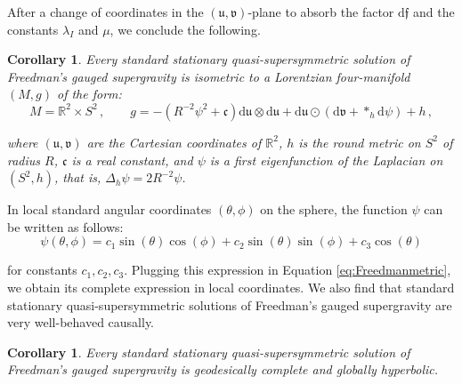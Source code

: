 \documentclass[10pt,a4paper,twoside,reqno]{amsart}
\theoremstyle{plain}
\newtheorem{cor}[thm]{Corollary}
\theoremstyle{definition}
\theoremstyle{remark}
\def\dd{\mathrm{d}}
\def\frf{\mathfrak{f}}
\def\dd{\mathrm{d}}
\def\fru{\mathfrak{u}}
\def\frv{\mathfrak{v}}
\def\frc{\mathfrak{F}}
\def\frc{\mathfrak{c}}
\begin{document}
After a change of coordinates in the $(\fru,\frv)$-plane to absorb the factor $\dd\frf$ and the constants $\lambda_I$ and $\mu$, we conclude the following.

\begin{cor}
Every standard stationary quasi-supersymmetric solution of Freedman's gauged supergravity is isometric to a Lorentzian four-manifold $(M,g)$ of the form:
\begin{equation}
\label{eq:Freedmanmetric}
M = \mathbb{R}^2\times S^2 \, , \qquad g =  -(R^{-2}\psi^2+\frc)\dd\fru\otimes \dd\fru + \dd \fru \odot ( \dd\frv +  \ast_h\dd\psi) + h\, ,
\end{equation}

\noindent
where $(\fru,\frv)$ are the Cartesian coordinates of $\mathbb{R}^2$, $h$ is the round metric on $S^2$ of radius $R$, $\frc$ is a real constant, and $\psi$ is a first eigenfunction of the Laplacian on $(S^2,h)$, that is, $\Delta_h\psi=2R^{-2}\psi$.
\end{cor} 

In local standard angular coordinates $(\theta,\phi)$ on the sphere, the function $\psi$ can be written as follows:
\begin{equation*}
\psi(\theta,\phi)= c_1 \sin(\theta) \cos (\phi) + c_2 \sin(\theta)\sin(\phi) + c_3 \cos(\theta)
\end{equation*}

\noindent
for constants $c_1, c_2, c_3$. Plugging this expression in Equation \eqref{eq:Freedmanmetric}, we obtain its complete expression in local coordinates. We also find that standard stationary quasi-supersymmetric solutions of Freedman's gauged supergravity are very well-behaved causally.

\begin{cor}
Every standard stationary quasi-supersymmetric solution of Freedman's gauged supergravity is geodesically complete and globally hyperbolic.
\end{cor}
\end{document}
